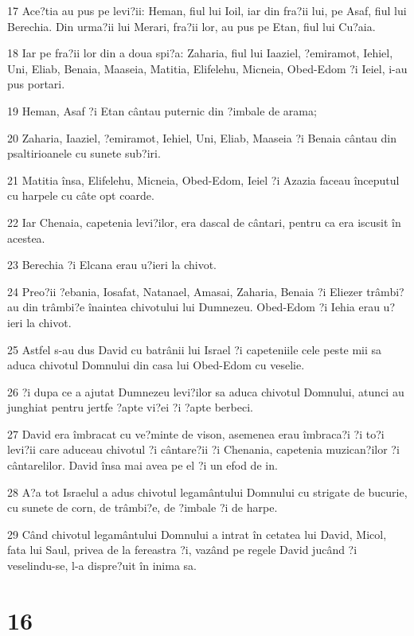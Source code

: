 \par 17 Ace?tia au pus pe levi?ii: Heman, fiul lui Ioil, iar din fra?ii lui, pe Asaf, fiul lui Berechia. Din urma?ii lui Merari, fra?ii lor, au pus pe Etan, fiul lui Cu?aia.
\par 18 Iar pe fra?ii lor din a doua spi?a: Zaharia, fiul lui Iaaziel, ?emiramot, Iehiel, Uni, Eliab, Benaia, Maaseia, Matitia, Elifelehu, Micneia, Obed-Edom ?i Ieiel, i-au pus portari.
\par 19 Heman, Asaf ?i Etan cântau puternic din ?imbale de arama;
\par 20 Zaharia, Iaaziel, ?emiramot, Iehiel, Uni, Eliab, Maaseia ?i Benaia cântau din psaltirioanele cu sunete sub?iri.
\par 21 Matitia însa, Elifelehu, Micneia, Obed-Edom, Ieiel ?i Azazia faceau începutul cu harpele cu câte opt coarde.
\par 22 Iar Chenaia, capetenia levi?ilor, era dascal de cântari, pentru ca era iscusit în acestea.
\par 23 Berechia ?i Elcana erau u?ieri la chivot.
\par 24 Preo?ii ?ebania, Iosafat, Natanael, Amasai, Zaharia, Benaia ?i Eliezer trâmbi?au din trâmbi?e înaintea chivotului lui Dumnezeu. Obed-Edom ?i Iehia erau u?ieri la chivot.
\par 25 Astfel s-au dus David cu batrânii lui Israel ?i capeteniile cele peste mii sa aduca chivotul Domnului din casa lui Obed-Edom cu veselie.
\par 26 ?i dupa ce a ajutat Dumnezeu levi?ilor sa aduca chivotul Domnului, atunci au junghiat pentru jertfe ?apte vi?ei ?i ?apte berbeci.
\par 27 David era îmbracat cu ve?minte de vison, asemenea erau îmbraca?i ?i to?i levi?ii care aduceau chivotul ?i cântare?ii ?i Chenania, capetenia muzican?ilor ?i cântarelilor. David însa mai avea pe el ?i un efod de in.
\par 28 A?a tot Israelul a adus chivotul legamântului Domnului cu strigate de bucurie, cu sunete de corn, de trâmbi?e, de ?imbale ?i de harpe.
\par 29 Când chivotul legamântului Domnului a intrat în cetatea lui David, Micol, fata lui Saul, privea de la fereastra ?i, vazând pe regele David jucând ?i veselindu-se, l-a dispre?uit în inima sa.

\chapter{16}

